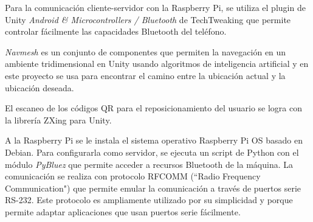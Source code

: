 \documentclass{article}
\newenvironment{standalone}{\begin{preview}}{\end{preview}}
\begin{document}
\begin{standalone}
  Para la comunicación cliente-servidor con la Raspberry Pi, se utiliza el plugin de Unity \textit{Android \& Microcontrollers / Bluetooth} de TechTweaking que permite controlar fácilmente las capacidades Bluetooth del teléfono.

  \textit{Navmesh} es un conjunto de componentes que permiten la navegación en un ambiente tridimensional en Unity usando algoritmos de inteligencia artificial y en este proyecto se usa para encontrar el camino entre la ubicación actual y la ubicación deseada.

  El escaneo de los códigos QR para el reposicionamiento del usuario se logra con la librería ZXing para Unity.

  A la Raspberry Pi se le instala el sistema operativo Raspberry Pi OS basado en Debian.
  Para configurarla como servidor, se ejecuta un script de Python con el módulo \textit{PyBluez} que permite acceder a recursos Bluetooth de la máquina.
  La comunicación se realiza con protocolo RFCOMM (``Radio Frequency Communication") que permite emular la comunicación a través de puertos serie RS-232.
  Este protocolo es ampliamente utilizado por su simplicidad y porque permite adaptar aplicaciones que usan puertos serie fácilmente.

\end{standalone}
\end{document}
